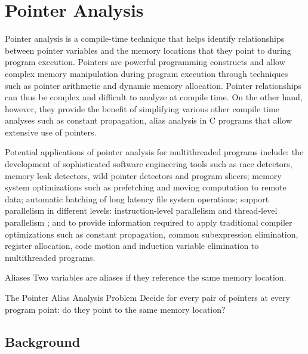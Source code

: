 \newpage




\section{Pointer Analysis}

Pointer analysis is a compile-time technique that helps identify relationships between pointer variables and the memory locations that 
they point to during program execution. Pointers are powerful programming constructs and allow complex memory manipulation during program 
execution through techniques such as pointer arithmetic and dynamic memory allocation. Pointer relationships can thus be complex and difficult 
to analyze at compile time. On the other hand, however, they provide the benefit of simplifying various other compile time analyses such as 
constant propagation, alias analysis in C programs that allow extensive use of pointers.\cite{Pointsto7:online}



Potential applications of pointer analysis for multithreaded programs include:
the development of sophisticated software engineering tools such as race detectors, memory leak detectors, wild pointer detectors and program slicers; 
memory system optimizations such as prefetching
and moving computation to remote data; automatic batching of long latency
file system operations; support parallelism in different levels: instruction-level parallelism and thread-level parallelism ;
and to provide information required to apply traditional
compiler optimizations such as constant propagation, common subexpression
elimination, register allocation, code motion and induction variable elimination
to multithreaded programs.\cite{rugina2003pointer}

\begin{definition}{Aliases}
    Two variables are aliases if they reference the same memory location.
\end{definition}


\begin{definition}{The	Pointer	Alias	Analysis	Problem	}
    Decide for every pair of pointers at every program point: do they point to the same memory location?
\end{definition}

\subsection{Background}

